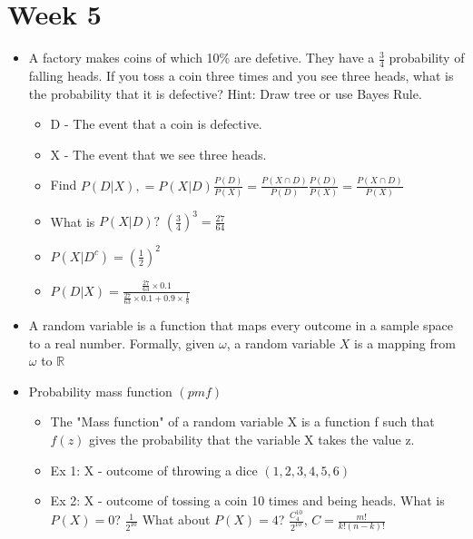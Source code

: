 \documentclass[12pt]{article}
\begin{document}
    \section{Week 5}
    \begin{itemize}
        \item A factory makes coins of which 10\% are defetive.
        They have a $\frac{3}{4}$ probability of falling heads.
        If you toss a coin three times and you see three heads, what is the probability that it is defective?
        Hint: Draw tree or use Bayes Rule.
        \begin{itemize}
            \item D - The event that a coin is defective.
            \item X - The event that we see three heads.
            \item Find $P(D|X), = P(X|D)\frac{P(D)}{P(X)} = \frac{P(X \cap D)}{P(D)} \frac{P(D)}{P(X)} = \frac{P(X \cap D)}{P(X)}$
            \item What is $P(X|D)? $ \guillemotright $(\frac{3}{4})^3 = \frac{27}{64}$
            \item $P(X|D^c) = (\frac{1}{2})^2$
            \item $P(D|X) = \frac{\frac{27}{63} \times 0.1}{\frac{27}{63} \times 0.1 + 0.9 \times \frac{1}{8}}$
        \end{itemize}
        \item A random variable is a function that maps every outcome in a sample space to a real number. Formally, given $\omega$,
        a random variable $X$ is a mapping from $\omega$ to $\mathbb{R}$
        \item Probability mass function $(pmf)$
        \begin{itemize}
            \item The "Mass function" of a random variable X is a function f such that $f(z)$ gives the
            probability that the variable X takes the value z.
            \item Ex 1: X - outcome of throwing a dice $(1,2,3,4,5,6)$
            \item Ex 2: X - outcome of tossing a coin 10 times and being heads. What is $P(X) = 0$? $\frac{1}{2^{10}}$ \newline
            What about $P(X) = 4$? \guillemotright $\frac{C_4^{10}}{2^{10}}$, $C=\frac{m!}{k!(n-k)!}$
        \end{itemize}
    \end{itemize}
\end{document}
